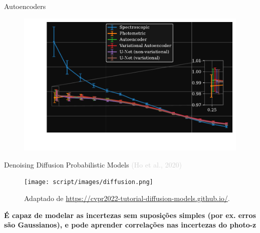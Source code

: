 \begin{frame}[c]{Autoencoders}
    \begin{figure}
        \centering
        \includegraphics[height=7cm]{script/images/2pcf_compare_corrfunc.pdf}
    \end{figure}
\end{frame}

\begin{frame}[c]{Denoising Diffusion Probabilistic Models  {\small \textcolor{LightGray}{(Ho et al., 2020)}}}
    \begin{figure}
        \centering
        \texttt{[image: script/images/diffusion.png]}
        \caption{Adaptado de \url{https://cvpr2022-tutorial-diffusion-models.github.io/}.}
    \end{figure}

    \centering
    \begin{splusbox}{}
        \textbf{É capaz de modelar as incertezas sem suposições simples (por ex. erros são Gaussianos), e pode aprender correlações nas incertezas do photo-z}
    \end{splusbox}
\end{frame}


